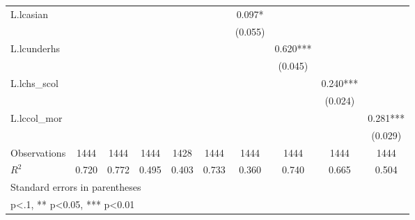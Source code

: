 {\begin{tabular}{l*{9}{c}}
\addlinespace
L.lcasian           &            &            &            &            &            &    0.097*  &            &            &            \\
                    &            &            &            &            &            &  (0.055)   &            &            &            \\
\addlinespace
L.lcunderhs         &            &            &            &            &            &            &    0.620***&            &            \\
                    &            &            &            &            &            &            &  (0.045)   &            &            \\
\addlinespace
L.lchs\_scol         &            &            &            &            &            &            &            &    0.240***&            \\
                    &            &            &            &            &            &            &            &  (0.024)   &            \\
\addlinespace
L.lccol\_mor         &            &            &            &            &            &            &            &            &    0.281***\\
                    &            &            &            &            &            &            &            &            &  (0.029)   \\
\midrule
Observations        &     1444   &     1444   &     1444   &     1428   &     1444   &     1444   &     1444   &     1444   &     1444   \\
\(R^{2}\)           &    0.720   &    0.772   &    0.495   &    0.403   &    0.733   &    0.360   &    0.740   &    0.665   &    0.504   \\
\bottomrule
\multicolumn{10}{l}{\footnotesize Standard errors in parentheses}\\
\multicolumn{10}{l}{\footnotesize * p<.1, ** p<0.05, *** p<0.01}\\
\end{tabular}
}
